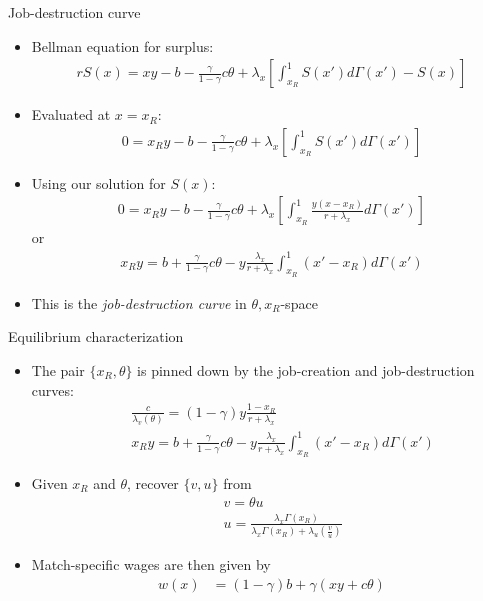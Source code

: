 \documentclass[9pt]{beamer}
\newcommand{\bit}{\begin{itemize}}
\newcommand{\eit}{\end{itemize}}
\begin{document}
\begin{frame}{Job-destruction curve}

\bit
\setlength\itemsep{1em}

\item Bellman equation for surplus:
\begin{align}
rS(x) =  xy-b-\frac{\gamma}{1-\gamma}c\theta + \lambda_x \left[\int_{x_R}^{1}S(x')d\Gamma(x') - S(x)\right] \nonumber
\end{align}
\item Evaluated at $x=x_R$:
\begin{align}
0 =  x_R y-b-\frac{\gamma}{1-\gamma}c\theta + \lambda_x \left[\int_{x_R}^{1}S(x')d\Gamma(x')\right] \nonumber
\end{align}
\item Using our solution for $S(x)$:
\begin{align}
0 =  x_R y-b-\frac{\gamma}{1-\gamma}c\theta + \lambda_x \left[\int_{x_R}^{1}\frac{ y(x-x_R)}{r+\lambda_x}d\Gamma(x')\right] \nonumber
\end{align}
or
\begin{eqnarray}
	x_Ry = b + \frac{\gamma}{1-\gamma}c\theta - y \frac{\lambda_x}{r+\lambda_x}  \int_{x_R}^{1} (x'-x_R)d\Gamma(x') \nonumber
\end{eqnarray}

\item This is the \emph{job-destruction curve} in $\theta,x_R$-space

\eit
\end{frame}



\begin{frame}{Equilibrium characterization}

\bit
\setlength\itemsep{1em}

\item The pair $\{x_R, \theta\}$ is pinned down by the job-creation and job-destruction curves:
\begin{eqnarray}
&& \frac{c}{\lambda_v(\theta)} = (1-\gamma) y \frac{1-x_R}{r+\lambda_x} \nonumber \\
&& x_Ry = b + \frac{\gamma}{1-\gamma}c\theta - y \frac{\lambda_x}{r+\lambda_x}  \int_{x_R}^{1} (x'-x_R)d\Gamma(x') \nonumber
\end{eqnarray}

\item Given $x_R$ and $\theta$, recover $\{v,u\}$ from
\begin{eqnarray}
&& v = \theta u\nonumber \\
&& u = \frac{\lambda_x \Gamma(x_R)}{\lambda_x \Gamma(x_R) + \lambda_u(\frac{v}{u})} \nonumber
\end{eqnarray}

\item Match-specific wages are then given by
\begin{eqnarray}
w(x) &= (1-\gamma)b + \gamma (xy+c\theta) \nonumber 
\end{eqnarray}


\eit
\end{frame}
\end{document}
